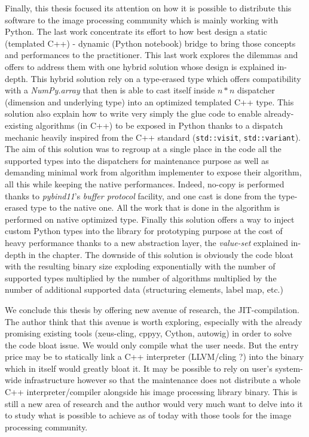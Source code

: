 Finally, this thesis focused its attention on how it is possible to distribute this software to the image processing
community which is mainly working with Python. The last work concentrate its effort to how best design a static
(templated C++) - dynamic (Python notebook) bridge to bring those concepts and performances to the practitioner. This
last work explores the dilemmas and offers to address them with one hybrid solution whose design is explained in-depth.
This hybrid solution rely on a type-erased type which offers compatibility with a \emph{NumPy.array} that then is able
to cast itself inside $n*n$ dispatcher (dimension and underlying type) into an optimized templated C++ type. This
solution also explain how to write very simply the glue code to enable already-existing algorithms (in C++) to be
exposed in Python thanks to a dispatch mechanic heavily inspired from the C++ standard (\texttt{std::visit},
\texttt{std::variant}). The aim of this solution was to regroup at a single place in the code all the supported types
into the dispatchers for maintenance purpose as well as demanding minimal work from algorithm implementer to expose
their algorithm, all this while keeping the native performances. Indeed, no-copy is performed thanks to
\emph{pybind11}'s \emph{buffer protocol} facility, and one cast is done from the type-erased type to the native one. All
the work that is done in the algorithm is performed on native optimized type. Finally this solution offers a way to
inject custom Python types into the library for prototyping purpose at the cost of heavy performance thanks to a new
abstraction layer, the \emph{value-set} explained in-depth in the chapter. The downside of this solution is obviously
the code bloat with the resulting binary size exploding exponentially with the number of supported types multiplied by
the number of algorithms multiplied by the number of additional supported data (structuring elements, label map, etc.)

We conclude this thesis by offering new avenue of research, the JIT-compilation. The author think that this avenue is
worth exploring, especially with the already promising existing tools (xeus-cling, cppyy, Cython, autowig) in order to
solve the code bloat issue. We would only compile what the user needs. But the entry price may be to statically link a
C++ interpreter (LLVM/cling ?) into the binary which in itself would greatly bloat it. It may be possible to rely on
user's system-wide infrastructure however so that the maintenance does not distribute a whole C++ interpreter/compiler
alongside his image processing library binary. This is still a new area of research and the author would very much want
to delve into it to study what is possible to achieve as of today with those tools for the image processing community.



